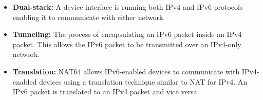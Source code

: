 \begin{itemize}
\item \textbf{Dual-stack:} A device interface is running both IPv4 and IPv6 protocols enabling it to communicate with either network.
\item \textbf{Tunneling:} The process of encapsulating an IPv6 packet inside an IPv4 packet. This allows the IPv6 packet to be transmitted over an IPv4-only network.
\item \textbf{Translation:} NAT64 allows IPv6-enabled devices to communicate with IPv4-enabled devices using a translation technique similar to NAT for IPv4. An IPv6 packet is translated to an IPv4 packet and vice versa.
\end{itemize}